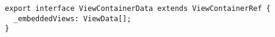 \begin{verbatim}
export interface ViewContainerData extends ViewContainerRef {
  _embeddedViews: ViewData[];
}
\end{verbatim}

